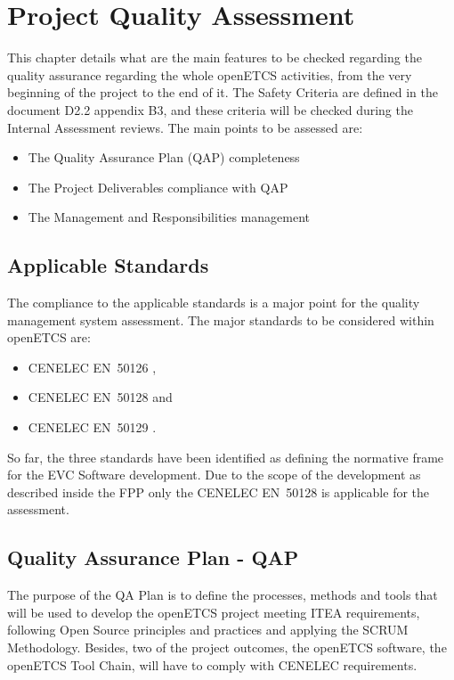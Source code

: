 \documentclass[openetcs]{template/openetcs_article}
\begin{document}
\newpage
\section{Project Quality Assessment}
This chapter details what are the main features to be checked regarding the quality assurance regarding the whole openETCS activities, from the very beginning
of the project to the end of it.
The Safety Criteria are defined in the document D2.2 appendix B3, and these criteria will be checked during the Internal Assessment reviews. The main points to
be assessed are:
\begin{itemize}
\item The Quality Assurance Plan (QAP) completeness
\item The Project Deliverables compliance with QAP
\item The Management and Responsibilities management 
\end{itemize}

\subsection{Applicable Standards}
The compliance to the applicable standards is a major point for the quality management system assessment.
The major standards to be considered within openETCS are:
\begin{itemize}
\item CENELEC EN~50126 \cite{EN50126},
\item CENELEC EN~50128 \cite{EN50128} and
\item CENELEC EN~50129 \cite{EN50129}.
\end{itemize}

So far, the three standards have been identified as defining the normative frame for the EVC Software development. Due to the scope of the development as described inside the FPP \cite{FPP} only the CENELEC EN~50128 is applicable for the assessment.

\subsection{Quality Assurance Plan - QAP}
The purpose of the QA Plan is to define the processes, methods and tools that will be used to develop the openETCS project meeting ITEA requirements, following
Open Source principles and practices and applying the SCRUM Methodology. Besides, two of the project outcomes, the openETCS software, the openETCS Tool Chain,
will have to comply with CENELEC requirements.
\end{document}
